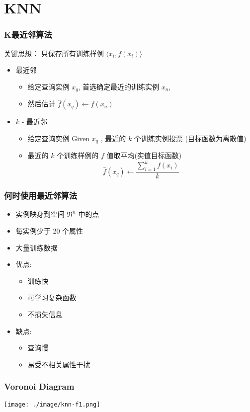 \documentclass{beamer}
\begin{document}
\section{KNN}
\label{sec-2}
\begin{frame}
\frametitle{K最近邻算法}
\label{sec-2-1}


关键思想： 只保存所有训练样例 $\langle x_i, f(x_i) \rangle$

\begin{itemize}
\item 最近邻
\begin{itemize}
\item 给定查询实例 $x_q$, 首选确定最近的训练实例 $x_n$,
\item 然后估计 $\hat{f}(x_q) \leftarrow f(x_n)$
\end{itemize}
\item $k$ - 最近邻
\begin{itemize}
\item 给定查询实例 Given $x_q$ , 最近的  $k$  个训练实例投票 (目标函数为离散值)
\item 最近的 $k$ 个训练样例的  $f$ 值取平均(实值目标函数)
        $$\hat{f}(x_{q}) \leftarrow  \frac{\sum_{i=1}^{k}f(x_{i})}{k}$$
\end{itemize}
\end{itemize}
\end{frame}
\begin{frame}
\frametitle{何时使用最近邻算法}
\label{sec-2-2}


\begin{itemize}
\item 实例映身到空间 $\Re^n$ 中的点
\item 每实例少于 20 个属性
\item 大量训练数据
\item 优点:
\begin{itemize}
\item 训练快
\item 可学习复杂函数
\item 不损失信息
\end{itemize}
\item 缺点:
\begin{itemize}
\item 查询慢
\item 易受不相关属性干扰
\end{itemize}
\end{itemize}
\end{frame}
\begin{frame}
\frametitle{Voronoi Diagram}
\label{sec-2-3}


\texttt{[image: ./image/knn-f1.png]}
\end{frame}
\end{document}
